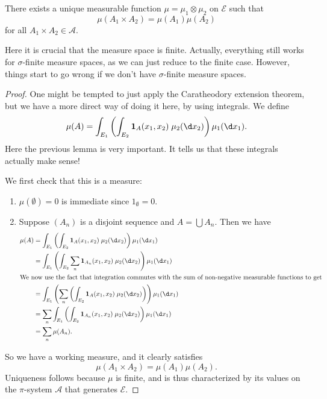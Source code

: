 \documentclass[a4paper]{article}
\begin{document}
\begin{thm}
  There exists a unique measurable function $\mu = \mu_1 \otimes \mu_2$ on $\mathcal{E}$ such that
  \[
    \mu(A_1 \times A_2) = \mu(A_1) \mu(A_2)
  \]
  for all $A_1 \times A_2 \in \mathcal{A}$.
\end{thm}

Here it is crucial that the measure space is finite. Actually, everything still works for $\sigma$-finite measure spaces, as we can just reduce to the finite case. However, things start to go wrong if we don't have $\sigma$-finite measure spaces.

\begin{proof}
  One might be tempted to just apply the Caratheodory extension theorem, but we have a more direct way of doing it here, by using integrals. We define
  \[
    \mu(A) = \int_{E_1} \left(\int_{E_2} \mathbf{1}_A(x_1, x_2)\;\mu_2(\d x_2)\right)\mu_1(\d x_1).
  \]
  Here the previous lemma is very important. It tells us that these integrals actually make sense!

  We first check that this is a measure:
  \begin{enumerate}
    \item $\mu(\emptyset) = 0$ is immediate since $1_{\emptyset} = 0$.
    \item Suppose $(A_n)$ is a disjoint sequence and $A = \bigcup A_n$. Then we have
      \begin{align*}
        \mu(A) &= \int_{E_1} \left(\int_{E_2} \mathbf{1}_A(x_1, x_2)\;\mu_2(\d x_2)\right)\mu_1(\d x_1)\\
        &= \int_{E_1} \left(\int_{E_2} \sum_n \mathbf{1}_{A_n}(x_1, x_2) \;\mu_2(\d x_2)\right)\mu_1(\d x_1)\\
        \intertext{We now use the fact that integration commutes with the sum of non-negative measurable functions to get}
        &= \int_{E_1} \left(\sum_n \left(\int_{E_2} \mathbf{1}_A(x_1, x_2)\;\mu_2(\d x_2)\right)\right)\mu_1(\d x_1)\\
        &= \sum_n \int_{E_1} \left(\int_{E_2} \mathbf{1}_{A_n}(x_1, x_2)\;\mu_2(\d x_2)\right)\mu_1(\d x_1)\\
        &= \sum_n \mu(A_n).
      \end{align*}
  \end{enumerate}
  So we have a working measure, and it clearly satisfies
  \[
    \mu(A_1 \times A_2) = \mu(A_1)\mu(A_2).
  \]
  Uniqueness follows because $\mu$ is finite, and is thus characterized by its values on the $\pi$-system $\mathcal{A}$ that generates $\mathcal{E}$.
\end{proof}
\end{document}
